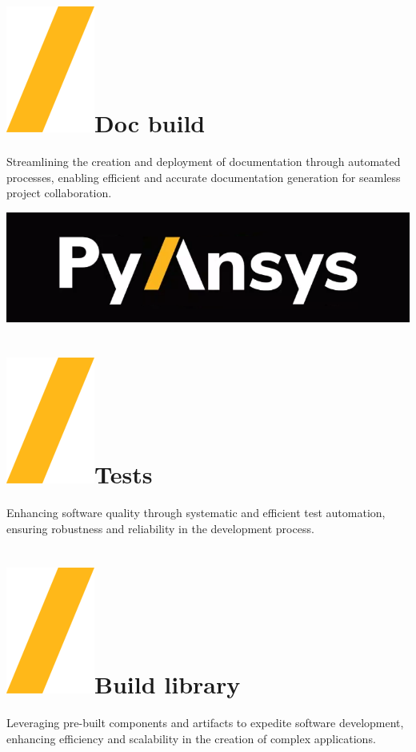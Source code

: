 \documentclass[a0paper,fleqn]{src/betterposter}
\begin{document}
{\section{\includegraphics[height=\fontcharht\font`\S]{img/example/slash.png}Doc build}
Streamlining the creation and deployment of documentation through automated
processes, enabling efficient and accurate documentation generation for seamless
project collaboration.


\vfill

\includegraphics[width=\textwidth]{img/example/pyansys_dark}\\

}{

\section{\includegraphics[height=\fontcharht\font`\S]{img/example/slash.png}Tests}
Enhancing software quality through systematic and efficient test automation,
ensuring robustness and reliability in the development process.

\section{\includegraphics[height=\fontcharht\font`\S]{img/example/slash.png}Build library}
Leveraging pre-built components and artifacts to expedite software development,
enhancing efficiency and scalability in the creation of complex applications.

}
\end{document}
